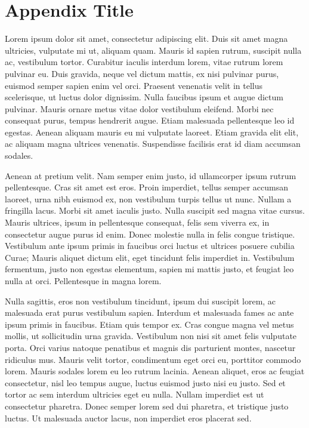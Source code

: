 \chapter{Appendix Title}

Lorem ipsum dolor sit amet,
consectetur adipiscing elit.
Duis sit amet magna ultricies,
vulputate mi ut,
aliquam quam.
Mauris id sapien rutrum,
suscipit nulla ac,
vestibulum tortor.
Curabitur iaculis interdum lorem,
vitae rutrum lorem pulvinar eu.
Duis gravida,
neque vel dictum mattis,
ex nisi pulvinar purus,
euismod semper sapien enim vel orci.
Praesent venenatis velit in tellus scelerisque,
ut luctus dolor dignissim.
Nulla faucibus ipsum et augue dictum pulvinar.
Mauris ornare metus vitae dolor vestibulum eleifend.
Morbi nec consequat purus,
tempus hendrerit augue.
Etiam malesuada pellentesque leo id egestas.
Aenean aliquam mauris eu mi vulputate laoreet.
Etiam gravida elit elit,
ac aliquam magna ultrices venenatis.
Suspendisse facilisis erat id diam accumsan sodales.

Aenean at pretium velit.
Nam semper enim justo,
id ullamcorper ipsum rutrum pellentesque.
Cras sit amet est eros.
Proin imperdiet,
tellus semper accumsan laoreet,
urna nibh euismod ex,
non vestibulum turpis tellus ut nunc.
Nullam a fringilla lacus.
Morbi sit amet iaculis justo.
Nulla suscipit sed magna vitae cursus.
Mauris ultrices,
ipsum in pellentesque consequat,
felis sem viverra ex,
in consectetur augue purus id enim.
Donec molestie nulla in felis congue tristique.
Vestibulum ante ipsum primis in faucibus orci luctus et ultrices posuere cubilia Curae;
Mauris aliquet dictum elit,
eget tincidunt felis imperdiet in.
Vestibulum fermentum,
justo non egestas elementum,
sapien mi mattis justo,
et feugiat leo nulla at orci.
Pellentesque in magna lorem.

Nulla sagittis,
eros non vestibulum tincidunt,
ipsum dui suscipit lorem,
ac malesuada erat purus vestibulum sapien.
Interdum et malesuada fames ac ante ipsum primis in faucibus.
Etiam quis tempor ex.
Cras congue magna vel metus mollis,
ut sollicitudin urna gravida.
Vestibulum non nisi sit amet felis vulputate porta.
Orci varius natoque penatibus et magnis dis parturient montes,
nascetur ridiculus mus.
Mauris velit tortor,
condimentum eget orci eu,
porttitor commodo lorem.
Mauris sodales lorem eu leo rutrum lacinia.
Aenean aliquet,
eros ac feugiat consectetur,
nisl leo tempus augue,
luctus euismod justo nisi eu justo.
Sed et tortor ac sem interdum ultricies eget eu nulla.
Nullam imperdiet est ut consectetur pharetra.
Donec semper lorem sed dui pharetra,
et tristique justo luctus.
Ut malesuada auctor lacus,
non imperdiet eros placerat sed.

